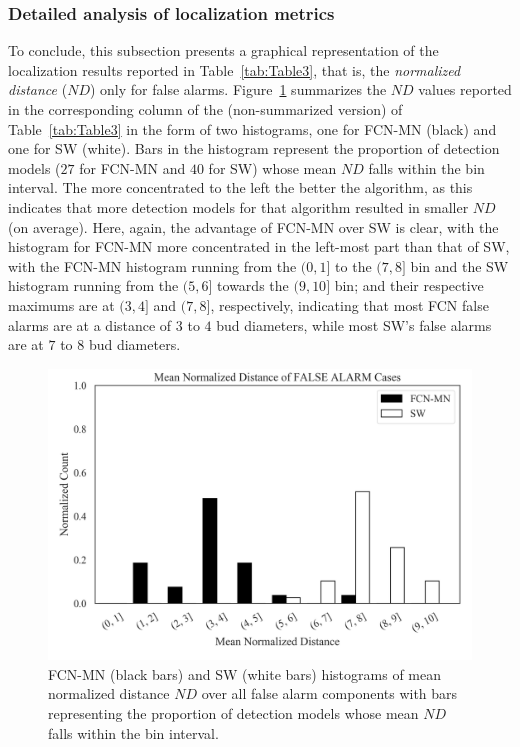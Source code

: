 \documentclass[a4paper,authoryear,review]{elsarticle}
\begin{document}
	\subsubsection{Detailed analysis of localization metrics}
	
	To conclude, this subsection presents a graphical representation of the localization results reported in Table~\ref{tab:Table3}, that is,  the \emph{normalized distance} ($ND$) only for false alarms. 
	Figure~\ref{fig:Figure7} summarizes the $ND$ values reported in the corresponding column of the (non-summarized version) of Table~\ref{tab:Table3} in the form of two histograms, one for FCN-MN (black) and one for SW (white).  Bars in the histogram represent the proportion of detection models ($27$ for FCN-MN and $40$ for SW) whose mean $ND$ falls within the bin interval. The more concentrated to the left the better the algorithm, as this indicates that more detection models for that algorithm resulted in smaller $ND$ (on average).
	Here, again, the advantage of FCN-MN over SW is clear, with the histogram for FCN-MN more concentrated in the left-most part than that of SW, with the FCN-MN histogram running from the $(0,1]$ to the $(7,8]$ bin and the SW histogram running from the $(5,6]$ towards the $(9,10]$ bin; and their respective maximums are at $(3,4]$ and $(7,8]$, respectively, indicating that most FCN false alarms are at a distance of $3$ to $4$ bud diameters, while most SW’s false alarms are at $7$ to $8$ bud diameters. 
	
	\begin{figure}%
		\centering
		\includegraphics[width=\textwidth]{figures/Figure7.png}%
		\caption{
			FCN-MN (black bars) and SW (white bars) histograms of mean normalized distance $ND$ over all false alarm components with bars representing the proportion of detection models whose mean $ND$ falls within the bin interval.
		}
		\label{fig:Figure7}
	\end{figure}
	
\end{document}
